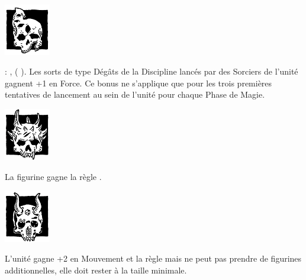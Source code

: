 \begin{multicols}{2}

\begin{center}\includegraphics[width=2cm]{pics/change.png}

\noindent\textbf{\chosenofchange}
\end{center}

\wizardconclave{} : \changesignature{}, \changespellone{} (\Pathof{} \change{}). Les sorts de type Dégâts de la Discipline \change{} lancés par des Sorciers de l'unité gagnent +1 en Force. Ce bonus ne s'applique que pour les trois premières tentatives de lancement au sein de l'unité pour chaque Phase de Magie.

\vspace*{0.2cm}\vspace*{\fill}

\begin{center}\includegraphics[width=2cm]{pics/wrath.png}

\noindent\textbf{\chosenofwrath}
\end{center}

La figurine gagne la règle \frenzy{}.

\columnbreak

\begin{center}\includegraphics[width=2cm]{pics/lust.png}

\noindent\textbf{\chosenoflust}
\end{center}

L'unité gagne +2 en Mouvement et la règle \skirmisher{} mais ne peut pas prendre de figurines additionnelles, elle doit rester à la taille minimale.

\vspace*{0.2cm}\vspace*{\fill}


\end{multicols}
